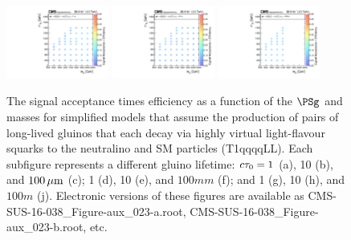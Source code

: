 \begin{figure}
\begin{center}
            \includegraphics[width=0.30\textwidth]{Supplementary/CMS-SUS-16-038_Figure-aux_023-g}
            \includegraphics[width=0.30\textwidth]{Supplementary/CMS-SUS-16-038_Figure-aux_023-h}
            \includegraphics[width=0.30\textwidth]{Supplementary/CMS-SUS-16-038_Figure-aux_023-i}
  \caption{ The signal acceptance times efficiency as a function of 
	    the $\PSg$ and \PSGczDo
    masses for simplified models that assume the production of pairs
    of long-lived gluinos that each decay via highly virtual
    light-flavour squarks to the neutralino and SM particles
    (T1qqqqLL). 
	    Each subfigure represents a different gluino lifetime:
    $c\tau_{0} = 1$ (a), 10 (b), and $100\,{\mu}\text{m}$ (c);
	     1 (d), 10 (e), and $100\unit{mm}$ (f);
	     and 1 (g), 10 (h), and $100\unit{m}$ (j).
    Electronic versions of these figures are available as
	    CMS-SUS-16-038\_Figure-aux\_023-a.root,
	    CMS-SUS-16-038\_Figure-aux\_023-b.root, etc.}
        \label{fig:T1qqqqLL_eff}
    \end{center}
\end{figure}


